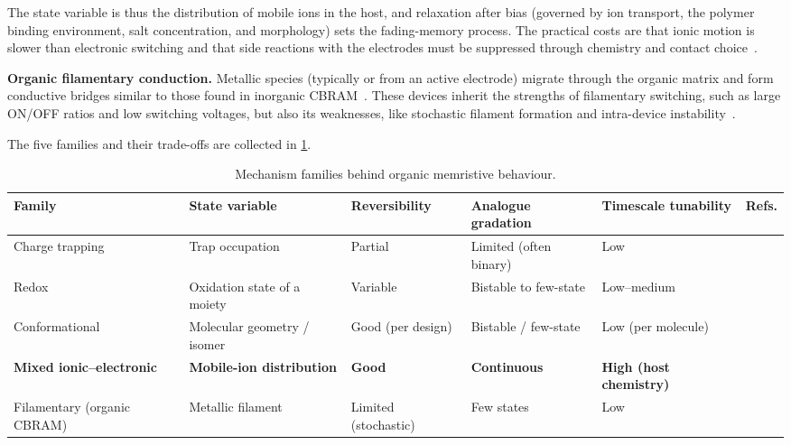 \documentclass[12pt, twoside]{report}
\begin{document}
The state variable is thus the distribution of mobile ions in the host, and relaxation after bias (governed by ion transport, the polymer binding environment, salt concentration, and morphology) sets the fading-memory process. The practical costs are that ionic motion is slower than electronic switching and that side reactions with the electrodes must be suppressed through chemistry and contact choice~\cite{Fang2008}.

\textbf{Organic filamentary conduction.} Metallic species (typically  or  from an active electrode) migrate through the organic matrix and form conductive bridges similar to those found in inorganic CBRAM~\cite{WaserAono2007, Valov2011}. These devices inherit the strengths of filamentary switching, such as large ON/OFF ratios and low switching voltages, but also its weaknesses, like stochastic filament formation and intra-device instability~\cite{ScottBozano2007, Yang2006}.

The five families and their trade-offs are collected in \cref{tab:organic_mechanisms}.

\begin{table}
  \centering
  \caption{Mechanism families behind organic memristive behaviour.}\label{tab:organic_mechanisms}
  \scriptsize
  \setlength{\tabcolsep}{3pt}
  \begin{tabularx}{\textheight}{l X l l l l}
    \toprule
    \textbf{Family} & \textbf{State variable} & \textbf{Reversibility} & \textbf{Analogue gradation} & \textbf{Timescale tunability} & \textbf{Refs.} \\
    \midrule
    Charge trapping                       & Trap occupation                          & Partial             & Limited (often binary)    & Low                             & \cite{Lei2014} \\
    Redox                                 & Oxidation state of a moiety              & Variable            & Bistable to few-state     & Low--medium                     & \cite{Liu2016, Zakhidov2010} \\
    Conformational                        & Molecular geometry / isomer              & Good (per design)   & Bistable / few-state      & Low (per molecule)              & \cite{Goswami2017, Goswami2020} \\
    \textbf{Mixed ionic--electronic}      & \textbf{Mobile-ion distribution}         & \textbf{Good}       & \textbf{Continuous}       & \textbf{High (host chemistry)}  & \cite{VanDeBurgt2017, Fuller2019, VanDeBurgt2018} \\
    Filamentary (organic CBRAM)           & Metallic filament                        & Limited (stochastic)& Few states                & Low                             & \cite{ScottBozano2007, Yang2006} \\
    \bottomrule
  \end{tabularx}
\end{table}
\end{document}
